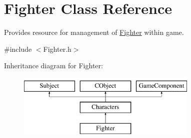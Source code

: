 \hypertarget{class_fighter}{}\section{Fighter Class Reference}
\label{class_fighter}


Provides resource for management of \hyperlink{class_fighter}{Fighter} within game.  




{\ttfamily \#include $<$Fighter.\+h$>$}

Inheritance diagram for Fighter\+:\begin{figure}[H]
\begin{center}
\leavevmode
\includegraphics[height=3.000000cm]{class_fighter}
\end{center}
\end{figure}
